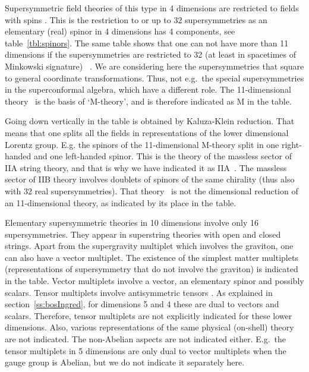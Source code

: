 \documentclass[a4paper,11pt,twoside]{article}
\begin{document}
Supersymmetric field theories of this type in 4 dimensions are restricted
to fields with spins \coordHE{}. This is the restriction to \coordHE{} or up
to 32 supersymmetries as an elementary (real) spinor in 4 dimensions has
4 components, see table~\ref{tbl:spinors}. The same table shows that one
can not have more than 11 dimensions if the supersymmetries are
restricted to 32 (at least in spacetimes of Minkowski
signature)~\cite{Nahm:1978tg} . We are considering here the
supersymmetries that square to general coordinate transformations. Thus,
not e.g.\ the special supersymmetries in the superconformal algebra,
which have a different role. The 11-dimensional
theory~\cite{Cremmer:1978km} is the basis of `M-theory', and is therefore
indicated as M in the table.

Going down vertically in the table is obtained by Kaluza-Klein reduction.
That means that one splits all the fields in representations of the lower
dimensional Lorentz group. E.g. the spinors of the 11-dimensional
M-theory split in one right-handed and one left-handed spinor. This is
the theory of the massless sector of IIA string theory, and that is why
we have indicated it as
IIA~\cite{Campbell:1984zc,Huq:1985im,Giani:1984wc}. The massless sector
of IIB theory involves doublets of spinors of the same chirality (thus
also with 32 real supersymmetries). That
theory~\cite{Schwarz:1983wa,Schwarz:1983qr,Howe:1984sr} is not the
dimensional reduction of an 11-dimensional theory, as indicated by its
place in the table.

Elementary supersymmetric theories in 10 dimensions involve only 16
supersymmetries. They appear in superstring theories with open and closed
strings. Apart from the supergravity multiplet which involves the
graviton, one can also have a vector multiplet. The existence of the
simplest matter multiplets (representations of supersymmetry that do not
involve the graviton) is indicated in the table. Vector multiplets
involve a vector, an elementary spinor and possibly scalars. Tensor
multiplets involve antisymmetric tensors \coordHE{}. As explained in
section~\ref{ss:bosIngred}, for dimensions 5 and 4 these are dual to
vectors and scalars. Therefore, tensor multiplets are not explicitly
indicated for these lower dimensions. Also, various representations of
the same physical (on-shell) theory are not indicated. The non-Abelian
aspects are not indicated either. E.g.\ the tensor multiplets in 5
dimensions are only dual to vector multiplets when the gauge group is
Abelian, but we do not indicate it separately here.
\end{document}
